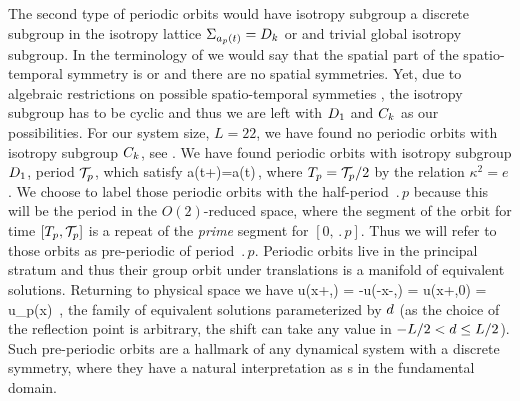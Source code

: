 The second type of periodic orbits would have isotropy subgroup a discrete
subgroup in the isotropy lattice $\Sigma_{a_p(t)}=D_{k}$ or  and trivial global
isotropy subgroup. In the terminology
of  we would say that the spatial part of the spatio-temporal symmetry
is  or  and there are no spatial symmetries. Yet, due to algebraic restrictions on possible spatio-temporal symmeties \cite[Chapter 3]{golubitsky2002sp}, the isotropy subgroup has to be 
cyclic and thus we are left with $D_{1}$ and $C_{k}$ as our possibilities. For our system size, $L=22$,
we have found no periodic orbits with isotropy subgroup $C_{k}$, see . 
We have found periodic orbits with isotropy subgroup $D_{1}$, period ${\mathcal{T}_{p}}$, which satisfy
\beq
	\Refl a(t+)=a(t)\,,
	\label{eq:ppo}
\eeq 
where ${T_{p}}={\mathcal{T}_{p}}/2$ by the relation $\kappa^2=e$. We choose to label those 
periodic orbits with the half-period $\period{p}$ because this will be the period in the $O(2)$-reduced space,
where the segment of the orbit for time $[{T_{p}},{\mathcal{T}_{p}}]$ is a repeat of the \emph{prime} segment 
for $[0,\period{p}]$. Thus we will refer to those orbits as pre-periodic of period $\period{p}$.
Periodic orbits  live in the principal stratum and thus their group orbit under translations  is a manifold of equivalent solutions. Returning to physical space we have
\beq
  \Refl u(x+\shift,) =
  -u(-x-\shift,) = u(x+\shift,0) = u_p(x)
  \,,
\label{KSpos}
\eeq
the family of equivalent solutions
parameterized by $d$
(as the choice of the reflection point is arbitrary,
the shift can take any value in $-L/2 < d \leq L/2$).
Such pre-periodic orbits
are a hallmark of any dynamical system with a discrete
symmetry, where they have a natural
interpretation as \po s in the
fundamental domain.

